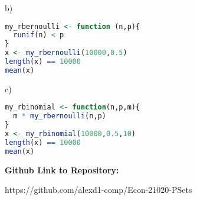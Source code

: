 b)

\begin{lstlisting}[language=R]
my_rbernoulli <- function (n,p){
  runif(n) < p
}
x <- my_rbernoulli(10000,0.5)
length(x) == 10000
mean(x)
\end{lstlisting}

c)

\begin{lstlisting}[language=R]
my_rbinomial <- function(n,p,m){
  m * my_rbernoulli(n,p)
}
x <- my_rbinomial(10000,0.5,10)
length(x) == 10000
mean(x)
\end{lstlisting}


\newpage
\textbf{Github Link to Repository:}

https://github.com/alexd1-comp/Econ-21020-PSets




